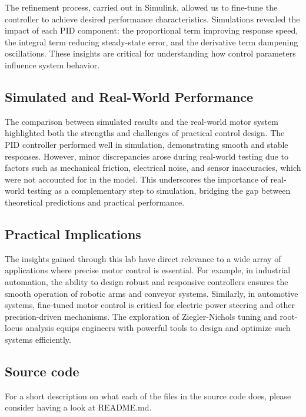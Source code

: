 The refinement process, carried out in Simulink, allowed us to fine-tune the controller to achieve desired 
performance characteristics. Simulations revealed the impact of each PID component: the proportional term 
improving response speed, the integral term reducing steady-state error, and the derivative term dampening 
oscillations. These insights are critical for understanding how control parameters influence system behavior.

\subsection{Simulated and Real-World Performance}

The comparison between simulated results and the real-world motor system highlighted both the strengths and 
challenges of practical control design. The PID controller performed well in simulation, demonstrating smooth 
and stable responses. However, minor discrepancies arose during real-world testing due to factors such as 
mechanical friction, electrical noise, and sensor inaccuracies, which were not accounted for in the model. 
This underscores the importance of real-world testing as a complementary step to simulation, bridging the gap 
between theoretical predictions and practical performance.

\subsection{Practical Implications}

The insights gained through this lab have direct relevance to a wide array of applications where precise motor 
control is essential. For example, in industrial automation, the ability to design robust and responsive 
controllers ensures the smooth operation of robotic arms and conveyor systems. Similarly, in automotive systems, 
fine-tuned motor control is critical for electric power steering and other precision-driven mechanisms. 
The exploration of Ziegler-Nichols tuning and root-locus analysis equips engineers with powerful tools to design 
and optimize such systems efficiently.

\subsection{Source code}
For a short description on what each of the files in the source code does, please consider having a look at 
README.md.

